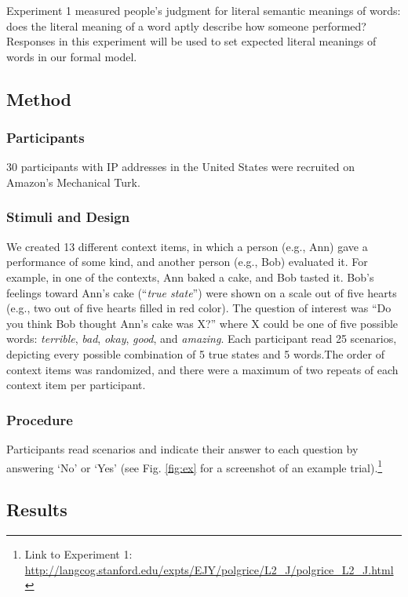 \documentclass[10pt,letterpaper]{article}
\newcommand{\ndg}[1]{\textcolor{Green}{[ndg: #1]}}
\begin{document}
Experiment 1 measured people's judgment for literal semantic meanings of words: 
does the literal meaning of a word aptly describe how someone performed?
Responses in this experiment will be used to set expected literal meanings of words in our formal model.

\subsection{Method}

\subsubsection{Participants}

30 participants with IP addresses in the United States were recruited on Amazon's Mechanical Turk. 

\subsubsection{Stimuli and Design}

We created 13 different context items, in which a person (e.g., Ann) gave a performance of some kind, and another person (e.g., Bob) evaluated it. For example, in one of the contexts, Ann baked a cake, and Bob tasted it. Bob's feelings toward Ann's cake (``\emph{true state}'') were shown on a scale out of five hearts (e.g., two out of five hearts filled in red color). The question of interest was ``Do you think Bob thought Ann's cake was X?'' where X could be one of five possible words: \emph{terrible}, \emph{bad}, \emph{okay}, \emph{good}, and \emph{amazing}. Each participant read 25 scenarios, depicting every possible combination of 5 true states and 5 words.The order of context items was randomized, and there were a maximum of two repeats of each context item per participant.

\subsubsection{Procedure}

Participants read scenarios and indicate their answer to each question by answering `No' or `Yes' (see Fig. \ref{fig:ex} for a screenshot of an example trial).\footnote{Link to Experiment 1: \url{http://langcog.stanford.edu/expts/EJY/polgrice/L2_J/polgrice_L2_J.html}} 

\subsection{Results}
\end{document}
